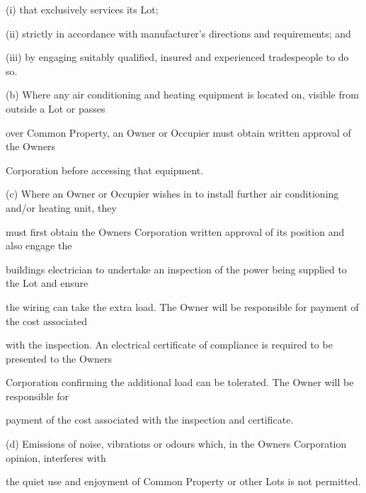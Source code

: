 \documentclass{article}
\begin{document}
{\fontsize{9.962}{1}(i) that exclusively services its Lot; }

{\fontsize{9.962}{1}(ii) strictly in accordance with manufacturer’s directions and requirements; and }

{\fontsize{9.962}{1}(iii) by engaging suitably qualified, insured and experienced tradespeople to do so. }

{\fontsize{9.962}{1}(b) Where any air conditioning and heating equipment is located on, visible from outside a Lot or passes }

{\fontsize{10.02}{1}over Common Property, an Owner or Occupier must obtain written approval of the Owners }

{\fontsize{10.02}{1}Corporation before accessing that equipment. }

{\fontsize{9.962}{1}(c) Where an Owner or Occupier wishes in to install further air conditioning and/or heating unit, they }

{\fontsize{10.02}{1}must first obtain the Owners Corporation written approval of its position and also engage the }

{\fontsize{10.02}{1}buildings electrician to undertake an inspection of the power being supplied to the Lot and ensure }

{\fontsize{10.02}{1}the wiring can take the extra load. The Owner will be responsible for payment of the cost associated }

{\fontsize{10.02}{1}with the inspection. An electrical certificate of compliance is required to be presented to the Owners }

{\fontsize{10.02}{1}Corporation confirming the additional load can be tolerated. The Owner will be responsible for }

{\fontsize{10.02}{1}payment of the cost associated with the inspection and certificate. }

{\fontsize{9.962}{1}(d) Emissions of noise, vibrations or odours which, in the Owners Corporation opinion, interferes with }

{\fontsize{10.02}{1}the quiet use and enjoyment of Common Property or other Lots is not permitted. }

\newpage
\end{document}
